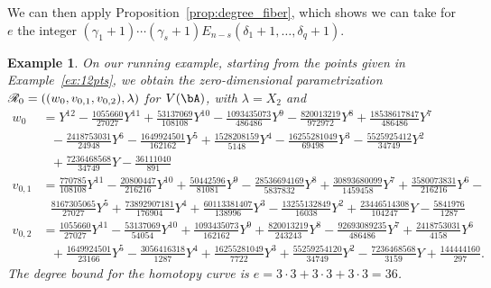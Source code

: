 \documentclass[12pt]{article}
\newtheorem{example}[definition]{Example}
\begin{document}
We can then apply Proposition~\ref{prop:degree_fiber}, which shows we
can take for $e$ the integer $(\gamma_1+1)\cdots(\gamma_s+1)
E_{n-s}(\delta_1+1, \ldots, \delta_q+1)$.  

\begin{example}\label{ex:12param}
On our running example, starting from the points given in 
Example~\ref{ex:12pts},
we obtain the zero-dimensional parametrization
$\mathscr{R}_0=((w_0,v_{0,1},v_{0,2}),\lambda)$
for $V(\bA)$, with $\lambda = X_2$ and
{\footnotesize  \begin{align*}
w_0 &=Y^{12} - \frac{1055660}{27027}Y^{11} + \frac{53137069}{108108}Y^{10} - \frac{1093435073}{486486}Y^9 - 
    \frac{820013219}{972972}Y^8 + \frac{18538617847}{486486}Y^7 \\
  &~~~- \frac{2418753031}{24948}Y^6 - 
    \frac{1649924501}{162162}Y^5 + \frac{1528208159}{5148}Y^4 - \frac{16255281049}{69498}Y^3 - 
    \frac{5525925412}{34749}Y^2\\
  &~~~ + \frac{7236468568}{34749}Y - \frac{36111040}{891}\\[1mm]
v_{0,1}&=
\frac{770785}{108108}Y^{11} - \frac{20800447}{216216}Y^{10} + \frac{50442596}{81081}Y^9 - 
    \frac{28536694169}{5837832}Y^8 + \frac{30893680099}{1459458}Y^7 + \frac{3580073831}{216216}Y^6 -  \\
  &~~~
    \frac{8167305065}{27027}Y^5 + \frac{73892907181}{176904}Y^4 + \frac{60113381407}{138996}Y^3 - 
    \frac{13255132849}{16038}Y^2 + \frac{23446514308}{104247}Y  - \frac{5841976}{1287}\\[1mm]
v_{0,2}&=\frac{1055660}{27027}Y^{11} - \frac{53137069}{54054}Y^{10} + \frac{1093435073}{162162}Y^9 + 
    \frac{820013219}{243243}Y^8 - \frac{92693089235}{486486}Y^7+ \frac{2418753031}{4158}Y^6 \\ &~~~ + 
    \frac{1649924501}{23166}Y^5 - \frac{3056416318}{1287}Y^4 + \frac{16255281049}{7722}Y^3 + 
    \frac{55259254120}{34749}Y^2 -\frac{7236468568}{3159}Y + \frac{144444160}{297}.
  \end{align*}}
The degree bound for the homotopy curve is $e=3\cdot3 + 3 \cdot 3 + 3\cdot 3 = 36$.
\end{example}
\end{document}
